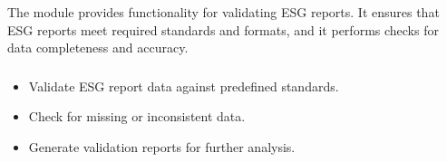 \documentclass[letterpaper,10pt,english]{sphinxmanual}
\begin{document}
\sphinxAtStartPar
The  module provides functionality for validating ESG reports. It ensures that ESG reports meet required standards and formats, and it performs checks for data completeness and accuracy.
\subsubsection*{}
\begin{itemize}
\item {} 
\sphinxAtStartPar
Validate ESG report data against predefined standards.

\item {} 
\sphinxAtStartPar
Check for missing or inconsistent data.

\item {} 
\sphinxAtStartPar
Generate validation reports for further analysis.

\end{itemize}
\end{document}
